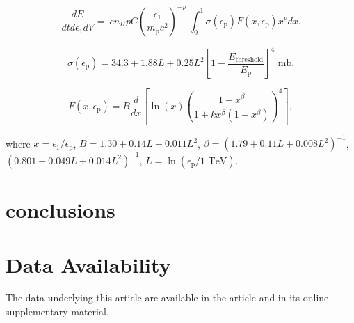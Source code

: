 \documentclass[twocolumn]{aastex631}
\begin{document}
\begin{equation}
  \frac{dE}{dtd\epsilon_{1}dV} =\
   cn_{H}pC\left(\frac{\epsilon_{1}}{m_{\text{p}}c^2}\right)^{-p}\
   \int_{0}^{1}\sigma(\epsilon_{\text{p}}) F(x,\epsilon_{\text{p}}) x^{p}dx.
\end{equation}

\begin{equation}
\sigma(\epsilon_{\text{p}})=34.3+1.88L+0.25L^{2}\left[1-\frac{E_{\text{threshold}}}{E_{\text{p}}}\right]^{4} \text{ mb}.
\end{equation}

\begin{equation}
F(x,\epsilon_{\text{p}})=B\frac{d}{dx}\left[\ln(x)\left(\frac{1-x^{\beta}}{1+kx^{\beta}\left(1-x^{\beta}\right)}\right)^4\right],
\end{equation}


where
$x=\epsilon_{1}/\epsilon_{\text{p}}$, $B=1.30+0.14L+0.011L^2$, $\beta=\left(1.79+0.11L+0.008L^{2}\right)^{-1}$,\
$\left(0.801+0.049L+0.014L^{2}\right)^{-1}$, $L=\ln(\epsilon_{\text{p}}/1 \text{ TeV})$.



\section{conclusions}

\section*{Data Availability}
The data underlying this article are available in the article and in its online supplementary material.





\appendix
\end{document}
